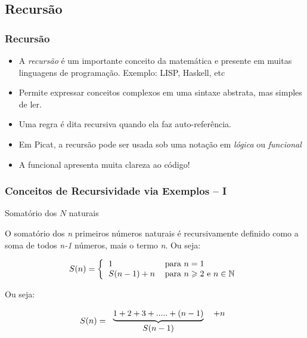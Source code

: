 \subsection{Recursão}
\begin{frame}[fragile]

\frametitle{Recursão}

\begin{itemize}

    \item A \textit{recursão} é um importante conceito da matemática e presente em muitas  linguagens
    de programação. Exemplo: LISP, Haskell, etc

    \pause
    \item Permite expressar conceitos complexos em uma sintaxe abstrata, mas  simples de ler.
    \pause
    \item Uma regra é dita recursiva quando ela faz auto-referência.
    
    \pause
    \item Em Picat, a recursão pode ser usada sob uma notação em \textit{lógica} ou \textit{funcional}
    
    \pause
    \item A funcional apresenta muita clareza ao código!
\end{itemize}

  
\end{frame}


\begin{frame}[fragile]

\frametitle{Conceitos de Recursividade via Exemplos -- I}

\begin{block}{Somatório dos $N$ naturais}

 O somatório dos \emph{n}  primeiros  números naturais é recursivamente 
 definido como a soma de todos \emph{n-1} números, mais o termo \emph{n}. 
 Ou seja:

    \[
    S(n)=\left \{
    \begin{tabular}
        [c]{ll}
        $1$ & para $n=1$ \\
        $S(n-1) + n $ & para $n \geqslant 2$ e $n \in \mathbb{N}$
    \end{tabular}
    \right.
    \]
    
    Ou seja:
    
    \[
    S(n)=
    \begin{tabular}[c]{cc}
        $\underbrace{1+2+3+.....+(n-1)}$ &  $  + n$\\
        $S(n-1)$ &
    \end{tabular}
    \]
\end{block}            

\end{frame}

